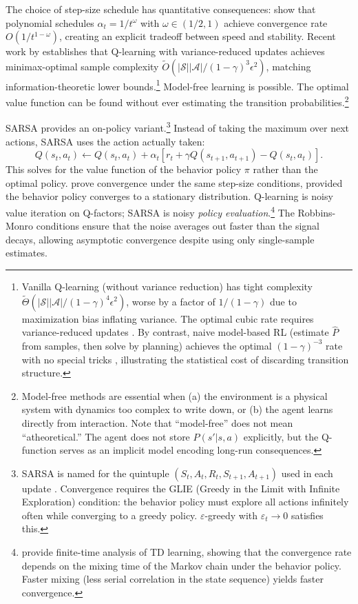 The choice of step-size schedule has quantitative consequences: \citet{evendar2003} show that polynomial schedules $\alpha_t = 1/t^\omega$ with $\omega \in (1/2, 1)$ achieve convergence rate $O(1/t^{1-\omega})$, creating an explicit tradeoff between speed and stability. Recent work by \citet{li2024minimax} establishes that Q-learning with variance-reduced updates achieves minimax-optimal sample complexity $\tilde{O}(|\mathcal{S}||\mathcal{A}|/(1-\gamma)^3\epsilon^2)$, matching information-theoretic lower bounds.\footnote{Vanilla Q-learning (without variance reduction) has tight complexity $\tilde{\Theta}(|\mathcal{S}||\mathcal{A}|/(1-\gamma)^4\epsilon^2)$, worse by a factor of $1/(1-\gamma)$ due to maximization bias inflating variance. The optimal cubic rate requires variance-reduced updates \citep{wainwright2019,sidford2018}. By contrast, naive model-based RL (estimate $\hat{P}$ from samples, then solve by planning) achieves the optimal $(1-\gamma)^{-3}$ rate with no special tricks \citep{agarwal2020}, illustrating the statistical cost of discarding transition structure.} Model-free learning is possible. The optimal value function can be found without ever estimating the transition probabilities.\footnote{Model-free methods are essential when (a) the environment is a physical system with dynamics too complex to write down, or (b) the agent learns directly from interaction. Note that ``model-free'' does not mean ``atheoretical.'' The agent does not store $P(s'|s,a)$ explicitly, but the Q-function serves as an implicit model encoding long-run consequences.}

SARSA provides an on-policy variant.\footnote{SARSA is named for the quintuple $(S_t, A_t, R_t, S_{t+1}, A_{t+1})$ used in each update \citep{rummery1994}. Convergence requires the GLIE (Greedy in the Limit with Infinite Exploration) condition: the behavior policy must explore all actions infinitely often while converging to a greedy policy. $\varepsilon$-greedy with $\varepsilon_t \to 0$ satisfies this.} Instead of taking the maximum over next actions, SARSA uses the action actually taken:
\begin{equation}
Q(s_t, a_t) \leftarrow Q(s_t, a_t) + \alpha_t \left[ r_t + \gamma Q(s_{t+1}, a_{t+1}) - Q(s_t, a_t) \right].
\end{equation}
This solves for the value function of the behavior policy $\pi$ rather than the optimal policy. \citet{singh2000} prove convergence under the same step-size conditions, provided the behavior policy converges to a stationary distribution. Q-learning is noisy value iteration on Q-factors; SARSA is noisy \emph{policy evaluation}.\footnote{\citet{bhandari2021finite} provide finite-time analysis of TD learning, showing that the convergence rate depends on the mixing time of the Markov chain under the behavior policy. Faster mixing (less serial correlation in the state sequence) yields faster convergence.} The Robbins-Monro conditions ensure that the noise averages out faster than the signal decays, allowing asymptotic convergence despite using only single-sample estimates.

